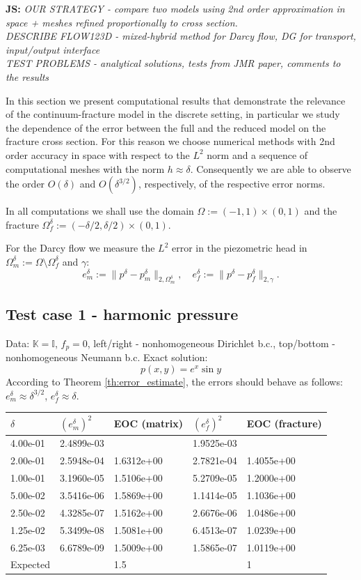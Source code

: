 \documentclass{llncs}
\def\tn#1{{\mathbb{#1}}}    %
\def\norm#1{\|#1\|}
\renewcommand{\note}[2]{{\color{blue} \textbf{ #1:} \textit{#2}}}
\begin{document}
\note{JS}{
OUR STRATEGY - compare two models using 2nd order approximation in space + meshes refined proportionally to cross section.
\\
DESCRIBE FLOW123D - mixed-hybrid method for Darcy flow, DG for transport, input/output interface
\\
TEST PROBLEMS - analytical solutions, tests from JMR paper, comments to the results
}

In this section we present computational results that demonstrate the relevance of the continuum-fracture model in the discrete setting, in particular we study the dependence of the error between the full and the reduced model on the fracture cross section.
For this reason we choose numerical methods with 2nd order accuracy in space with respect to the $L^2$ norm and a sequence of computational meshes with the norm $h\approx\delta$. Consequently we are able to observe the order $O(\delta)$ and $O(\delta^{3/2})$, respectively, of the respective error norms.

In all computations we shall use the domain $\Omega:=(-1,1)\times(0,1)$ and the fracture $\Omega_f^\delta:=(-\delta/2,\delta/2)\times(0,1)$.

For the Darcy flow we measure the $L^2$ error in the piezometric head in $\Omega_m^\delta:=\Omega\setminus\Omega_f^\delta$ and $\gamma$:
\[ e_m^\delta := \norm{p^\delta - p_m^\delta}_{2,\Omega_m^\delta},\quad e_f^\delta := \norm{p^\delta - p_f^\delta}_{2,\gamma}. \]


\subsection{Test case 1 - harmonic pressure}

Data: $\tn K=\tn I$, $f_p=0$, left/right - nonhomogeneous Dirichlet b.c., top/bottom - nonhomogeneous Neumann b.c.
Exact solution:
\[ p(x,y) = e^x\sin y \]
According to Theorem \ref{th:error_estimate}, the errors should behave as follows: $e_m^\delta\approx\delta^{3/2}$, $e_f^\delta\approx\delta$.

\begin{tabular}{|l|ll|ll|}
\hline
$\delta$ & $(e_m^\delta)^2$ & EOC (matrix) & $(e_f^\delta)^2$ & EOC (fracture)\\
\hline
4.00e-01 & 2.4899e-03 &            & 1.9525e-03 & \\
2.00e-01 & 2.5948e-04 & 1.6312e+00 & 2.7821e-04 & 1.4055e+00\\
1.00e-01 & 3.1960e-05 & 1.5106e+00 & 5.2709e-05 & 1.2000e+00\\
5.00e-02 & 3.5416e-06 & 1.5869e+00 & 1.1414e-05 & 1.1036e+00\\
2.50e-02 & 4.3285e-07 & 1.5162e+00 & 2.6676e-06 & 1.0486e+00\\
1.25e-02 & 5.3499e-08 & 1.5081e+00 & 6.4513e-07 & 1.0239e+00\\
6.25e-03 & 6.6789e-09 & 1.5009e+00 & 1.5865e-07 & 1.0119e+00\\
\hline
Expected & & 1.5 & & 1\\
\hline
\end{tabular}
\end{document}
